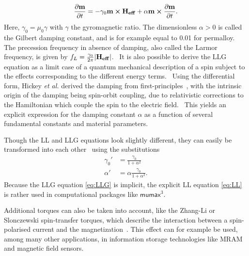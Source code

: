 \documentclass[11pt,a4paper,english]{article}
\newcommand{\mumax}{$\mathsf{mumax}^3$}
\begin{document}
\begin{equation}
    \frac{\partial \vb{m}}{\partial t} = - \gamma_0 \vb{m} \cross \vb{H_{eff}} + \alpha \vb{m} \cross \frac{\partial \vb{m}}{\partial t} \mathrm{.}
    \label{eq:LLG}
\end{equation}
Here, $\gamma_0=\mu_0 \gamma$ with $\gamma$ the gyromagnetic ratio. The dimensionless $\alpha > 0$ is called the Gilbert damping constant, and is for example equal to 0.01 for permalloy. The precession frequency in absence of damping, also called the Larmor frequency, is given by  $f_L=\frac{\gamma_0}{2\pi}\abs{\vb{H_{eff}}}$.~\cite{phd_leliaert} 
It is also possible to derive the LLG equation as a limit case of a quantum mechanical description of a spin subject to the effects corresponding to the different energy terms.~\cite{abert2013discrete,bode2012current}
Using the differential form, Hickey \textit{et al.} derived the damping from first-principles~\cite{hickey2009origin}, with the intrinsic origin of the damping being spin-orbit coupling, due to relativistic corrections to the Hamiltonian which couple the spin to the electric field.~\cite{hickey2009origin} This yields an explicit expression for the damping constant $\alpha$ as a function of several fundamental constants and material parameters. \par
Though the LL and LLG equations look slightly different, they can easily be transformed into each other~\cite{ThermFluc_SingleDomain,phd_leliaert} using the substitutions
\begin{align*}
    \gamma_0' &= \frac{\gamma_0}{1+\alpha^2} \\
    \alpha' &= \alpha \frac{\gamma_0}{1+\alpha^2} \mathrm{.}
\end{align*}
Because the LLG equation \eqref{eq:LLG} is implicit, the explicit LL equation \eqref{eq:LL} is rather used in computational packages like \mumax{}. \par
Additional torques can also be taken into account, like the Zhang-Li or Slonczewski spin-transfer torques, which describe the interaction between a spin-polarised current and the magnetization~\cite{ZhangLiSpinTransferTorque, MuMax3, syllabus_PoAEaPD}. This effect can for example be used, among many other applications, in information storage technologies like MRAM and magnetic field sensors.~\cite{syllabus_PoAEaPD}
\end{document}
